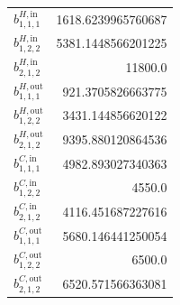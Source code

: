 \documentclass{article}%
\begin{document}
\begin{multicols*}{3}
\begin{supertabular}{lr}
	$b_{1,1,1}^{H,\text{in}}$ & 1618.6239965760687 \\%
	$b_{1,2,2}^{H,\text{in}}$ & 5381.1448566201225 \\%
	$b_{2,1,2}^{H,\text{in}}$ & 11800.0 \\%
	$b_{1,1,1}^{H,\text{out}}$ & 921.3705826663775 \\%
	$b_{1,2,2}^{H,\text{out}}$ & 3431.144856620122 \\%
	$b_{2,1,2}^{H,\text{out}}$ & 9395.880120864536 \\%
	$b_{1,1,1}^{C,\text{in}}$ & 4982.893027340363 \\%
	$b_{1,2,2}^{C,\text{in}}$ & 4550.0 \\%
	$b_{2,1,2}^{C,\text{in}}$ & 4116.451687227616 \\%
	$b_{1,1,1}^{C,\text{out}}$ & 5680.146441250054 \\%
	$b_{1,2,2}^{C,\text{out}}$ & 6500.0 \\%
	$b_{2,1,2}^{C,\text{out}}$ & 6520.571566363081 \\%
\end{supertabular}%
\end{multicols*}%
\clearpage%
\end{document}
